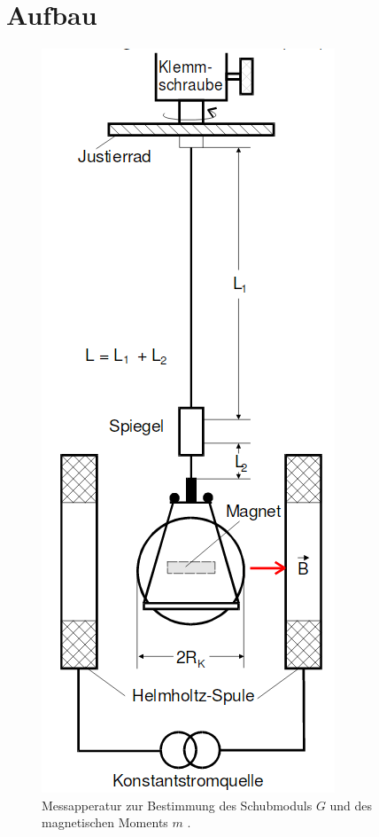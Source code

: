 \section{Aufbau}
\label{sec:Aufbau}

\begin{figure}[H]
         \centering
         \includegraphics[width=\linewidth-150pt,height=\textheight-150pt,keepaspectratio]{content/Bilder/Aufbau.png}
         \caption{Messapperatur zur Bestimmung des Schubmoduls $G$ und des magnetischen Moments $m$ \cite{V102}.}
         \label{fig:Aufbau}
       \end{figure}

